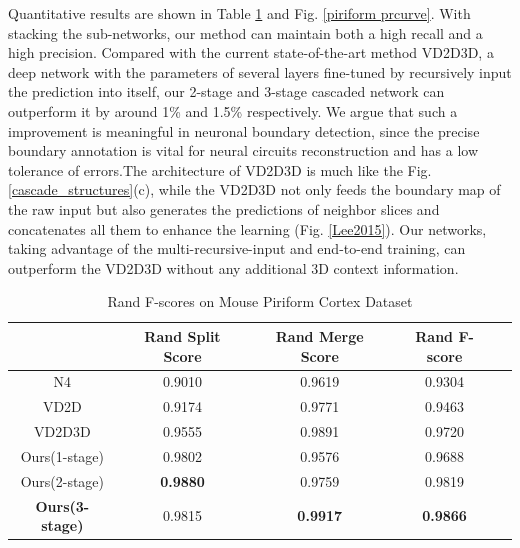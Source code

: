 \documentclass[senior]{IPSstyle}
\begin{document}
Quantitative results are shown in Table \ref{piriform fscore} and Fig. \ref{piriform prcurve}. With stacking the sub-networks, our method can maintain both a high recall and a high precision. Compared with the current state-of-the-art method VD2D3D\cite{Lee2015}, a deep network with the parameters of several layers fine-tuned by recursively input the prediction into itself, our 2-stage and 3-stage cascaded network can outperform it by around 1\% and 1.5\% respectively. We argue that such a improvement is meaningful in neuronal boundary detection, since the precise boundary annotation is vital for neural circuits reconstruction and has a low tolerance of errors.The architecture of VD2D3D is much like the Fig. \ref{cascade_structures}(c), while the VD2D3D not only feeds the boundary map of the raw input but also generates the predictions of neighbor slices and concatenates all them to enhance the learning (Fig. \ref{Lee2015}). Our networks, taking advantage of the multi-recursive-input and end-to-end training, can outperform the VD2D3D without any additional 3D context information. 

\begin{table}[t]
\renewcommand{\arraystretch}{1.2}
\caption{Rand F-scores on Mouse Piriform Cortex Dataset\cite{Lee2015}}
\label{outcome}
\begin{center}
\begin{tabular}{|c|c|c|c|c|}
\hline
&\multicolumn{1}{c|}{Rand Split Score}
&\multicolumn{1}{c|}{Rand Merge Score}
&\multicolumn{1}{c|}{Rand F-score}\\
\hline
N4\cite{Ciresan2012} 			& 0.9010 	& 0.9619 	& 0.9304	\\	\hline
VD2D\cite{Lee2015} 		& 0.9174	& 0.9771 	& 0.9463 	\\	\hline
VD2D3D\cite{Lee2015}	& 0.9555	& 0.9891	& 0.9720    \\	\hline
Ours(1-stage) 			& 0.9802 	& 0.9576	& 0.9688	\\	\hline
Ours(2-stage) 			& \textbf{0.9880}	& 0.9759 	& 0.9819 	\\	\hline
\textbf{Ours(3-stage)} 	& 0.9815 	& \textbf{0.9917} 	& \textbf{0.9866} 	\\	\hline
\end{tabular}
\end{center}
\label{piriform fscore}
\end{table}
\end{document}
